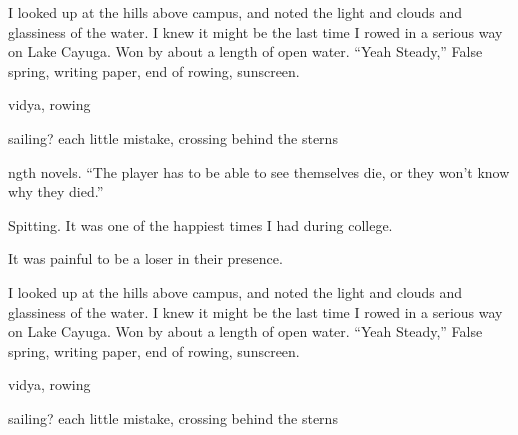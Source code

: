 I looked up at the hills above campus, and noted the light and clouds and
glassiness of the water.  I knew it might be the last time I rowed in a serious
way on Lake Cayuga.  Won by about a length of open water.  ``Yeah Steady,'' False
spring, writing paper, end of rowing, sunscreen.

vidya, rowing

 sailing?  each little mistake, crossing behind the sterns



	

ngth novels.  ``The player has to be able to see themselves die, or they won't
know why they died.'' 

	Spitting.  It was one of the happiest times I had during college.
	

It was painful to be a loser in their presence.  

I looked up at the hills above campus, and noted the light and clouds and
glassiness of the water.  I knew it might be the last time I rowed in a serious
way on Lake Cayuga.  Won by about a length of open water.  ``Yeah Steady,'' False
spring, writing paper, end of rowing, sunscreen.

vidya, rowing

 sailing?  each little mistake, crossing behind the sterns

